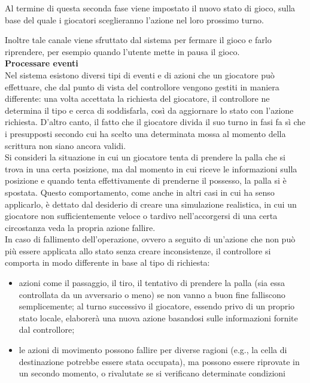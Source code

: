 Al termine di questa seconda fase viene impostato il nuovo stato di gioco, sulla base del quale i giocatori sceglieranno l'azione nel loro prossimo turno.

Inoltre tale canale viene sfruttato dal sistema per fermare il gioco e farlo riprendere, per esempio quando l'utente mette in pausa il gioco.\\

\textbf{Processare eventi}\\

Nel sistema esistono diversi tipi di eventi e di azioni che un giocatore può effettuare, che dal punto di vista del controllore vengono gestiti in maniera differente: una volta accettata la richiesta del giocatore, il controllore ne determina il tipo e cerca di soddisfarla, così da aggiornare lo stato con l'azione richiesta. D'altro canto, il fatto che il giocatore divida il suo turno in fasi fa sì che i presupposti secondo cui ha scelto una determinata mossa al momento della scrittura non siano ancora validi.\\

Si consideri la situazione in cui un giocatore tenta di prendere la palla che si trova in una certa posizione, ma dal momento in cui riceve le informazioni sulla posizione e quando tenta effettivamente di prenderne il possesso, la palla si è spostata. Questo comportamento, come anche in altri casi in cui ha senso applicarlo, è dettato dal desiderio di creare una simulazione realistica, in cui un giocatore non sufficientemente veloce o tardivo nell'accorgersi di una certa circostanza veda la propria azione fallire.\\

In caso di fallimento dell'operazione, ovvero a seguito di un'azione che non può più essere applicata allo stato senza creare inconsistenze, il controllore si comporta in modo differente in base al tipo di richiesta:

\begin{itemize}
	\item azioni come il passaggio, il tiro, il tentativo di prendere la palla (sia essa controllata da un avversario o meno) se non vanno a buon fine falliscono semplicemente; al turno successivo il giocatore, essendo privo di un proprio stato locale, elaborerà una nuova azione basandosi sulle informazioni fornite dal controllore;
	\item le azioni di movimento possono fallire per diverse ragioni (e.g., la cella di destinazione potrebbe essere stata occupata), ma possono essere riprovate in un secondo momento, o rivalutate se si verificano determinate condizioni
\end{itemize}

